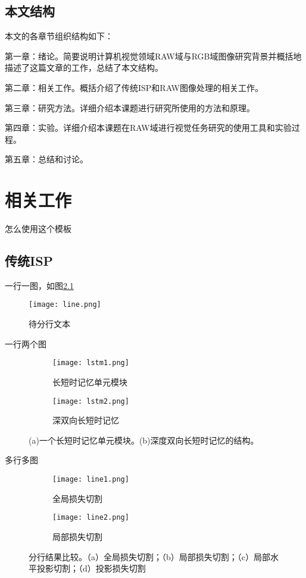 \documentclass[winfonts]{njuthesis}
\begin{document}
\section{本文结构}
本文的各章节组织结构如下：

第一章：绪论。简要说明计算机视觉领域RAW域与RGB域图像研究背景并概括地描述了这篇文章的工作，总结了本文结构。

第二章：相关工作。概括介绍了传统ISP和RAW图像处理的相关工作。

第三章：研究方法。详细介绍本课题进行研究所使用的方法和原理。

第四章：实验。详细介绍本课题在RAW域进行视觉任务研究的使用工具和实验过程。

第五章：总结和讨论。

\chapter{相关工作}\label{chapter_system}

怎么使用这个模板

\section{传统ISP}

一行一图，如图\ref{fig:line}
\begin{figure}[htbp]
   \centering
   \texttt{[image: line.png]} %
   \caption{待分行文本}
   \label{fig:line}
\end{figure}


一行两个图
\begin{figure}[ht!]
    \centering
    \begin{subfigure}{.5\textwidth}
    	\centering
        \texttt{[image: lstm1.png]}
        \caption{长短时记忆单元模块}
    \end{subfigure}
    \begin{subfigure}{.4\textwidth}
    	\centering
        \texttt{[image: lstm2.png]}
        \caption{深双向长短时记忆}
        \label{fig:lstm2}
    \end{subfigure}
    \caption{(a)一个长短时记忆单元模块。(b)深度双向长短时记忆的结构。}
\label{fig:lstm}
\end{figure}

多行多图
\begin{figure}[ht!]
    \centering
    \begin{subfigure}{\textwidth}
        \centering
        \texttt{[image: line1.png]}
        \caption{全局损失切割}
        \label{fig:line1}
    \end{subfigure}
    \begin{subfigure}{\textwidth}
    	\centering
        \texttt{[image: line2.png]}
        \caption{局部损失切割}
        \label{fig:line2}
    \end{subfigure}
    \caption{分行结果比较。（a）全局损失切割；（b）局部损失切割；（c）局部水平投影切割；（d）投影损失切割}
\end{figure}
\end{document}
